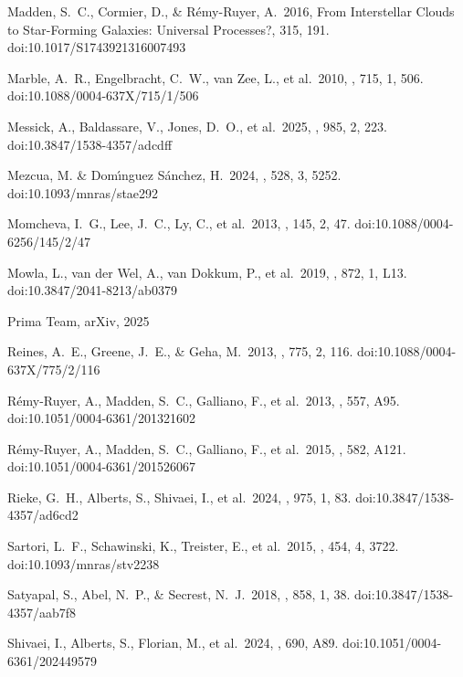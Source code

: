 \documentclass[twocolumn]{aastex63}
\begin{document}
{\begin{thebibliography}{}
{ Madden, S.~C., Cormier, D., \& R{\'e}my-Ruyer, A.\ 2016, From Interstellar Clouds to Star-Forming Galaxies: Universal Processes?, 315, 191. doi:10.1017/S1743921316007493

 Marble, A.~R., Engelbracht, C.~W., van Zee, L., et al.\ 2010, \apj, 715, 1, 506. doi:10.1088/0004-637X/715/1/506

 Messick, A., Baldassare, V., Jones, D.~O., et al.\ 2025, \apj, 985, 2, 223. doi:10.3847/1538-4357/adcdff

 Mezcua, M. \& Dom{\'\i}nguez S{\'a}nchez, H.\ 2024, \mnras, 528, 3, 5252. doi:10.1093/mnras/stae292

 Momcheva, I.~G., Lee, J.~C., Ly, C., et al.\ 2013, \aj, 145, 2, 47. doi:10.1088/0004-6256/145/2/47

 Mowla, L., van der Wel, A., van Dokkum, P., et al.\ 2019, \apjl, 872, 1, L13. doi:10.3847/2041-8213/ab0379

 Prima Team, arXiv, 2025

 Reines, A.~E., Greene, J.~E., \& Geha, M.\ 2013, \apj, 775, 2, 116. doi:10.1088/0004-637X/775/2/116

 R{\'e}my-Ruyer, A., Madden, S.~C., Galliano, F., et al.\ 2013, \aap, 557, A95. doi:10.1051/0004-6361/201321602

 R{\'e}my-Ruyer, A., Madden, S.~C., Galliano, F., et al.\ 2015, \aap, 582, A121. doi:10.1051/0004-6361/201526067

 Rieke, G.~H., Alberts, S., Shivaei, I., et al.\ 2024, \apj, 975, 1, 83. doi:10.3847/1538-4357/ad6cd2

 Sartori, L.~F., Schawinski, K., Treister, E., et al.\ 2015, \mnras, 454, 4, 3722. doi:10.1093/mnras/stv2238

 Satyapal, S., Abel, N.~P., \& Secrest, N.~J.\ 2018, \apj, 858, 1, 38. doi:10.3847/1538-4357/aab7f8

 Shivaei, I., Alberts, S., Florian, M., et al.\ 2024, \aap, 690, A89. doi:10.1051/0004-6361/202449579

}
\end{thebibliography}}
\end{document}
